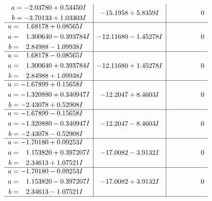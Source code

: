 \documentclass[1p]{elsarticle_modified}
\theoremstyle{definition}
\begin{document}
$$\begin{array}{c|c|c}
\begin{aligned}
a &= -2.03780 + 0.53450 I \\
b &= -3.70133 + 1.03303 I\end{aligned}
 & -15.1958 + 5.8359 I & \phantom{-0.000000 } 0 \\ \hline\begin{aligned}
u &= \phantom{-}1.68178 + 0.08565 I \\
a &= \phantom{-}1.300640 - 0.393784 I \\
b &= \phantom{-}2.84988 - 1.09938 I\end{aligned}
 & -12.11680 - 1.45278 I & \phantom{-0.000000 } 0 \\ \hline\begin{aligned}
u &= \phantom{-}1.68178 - 0.08565 I \\
a &= \phantom{-}1.300640 + 0.393784 I \\
b &= \phantom{-}2.84988 + 1.09938 I\end{aligned}
 & -12.11680 + 1.45278 I & \phantom{-0.000000 } 0 \\ \hline\begin{aligned}
u &= -1.67899 + 0.15658 I \\
a &= -1.320880 + 0.340947 I \\
b &= -2.43078 + 0.52908 I\end{aligned}
 & -12.2047 + 8.4603 I & \phantom{-0.000000 } 0 \\ \hline\begin{aligned}
u &= -1.67899 - 0.15658 I \\
a &= -1.320880 - 0.340947 I \\
b &= -2.43078 - 0.52908 I\end{aligned}
 & -12.2047 - 8.4603 I & \phantom{-0.000000 } 0 \\ \hline\begin{aligned}
u &= -1.70180 + 0.09253 I \\
a &= \phantom{-}1.153820 + 0.397207 I \\
b &= \phantom{-}2.34613 + 1.07521 I\end{aligned}
 & -17.0082 - 3.9132 I & \phantom{-0.000000 } 0 \\ \hline\begin{aligned}
u &= -1.70180 - 0.09253 I \\
a &= \phantom{-}1.153820 - 0.397207 I \\
b &= \phantom{-}2.34613 - 1.07521 I\end{aligned}
 & -17.0082 + 3.9132 I & \phantom{-0.000000 } 0\\
 \hline 
 \end{array}$$\newpage\newpage\renewcommand{\arraystretch}{1}
\end{document}
